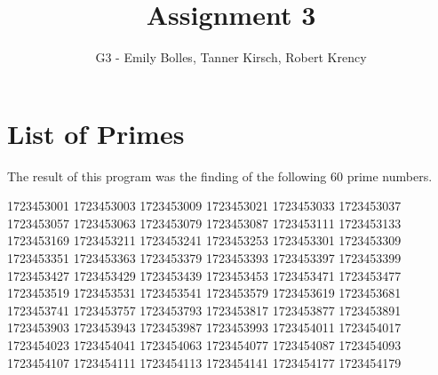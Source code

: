\documentclass[12pt]{article}
\title{Assignment 3}
\author{G3 - Emily Bolles, Tanner Kirsch, Robert Krency}
\date{}
\begin{document}
\maketitle

\section*{List of Primes}

The result of this program was the finding of the following \textbf{\(60\)} prime numbers.

\begin{center}
    1723453001  1723453003  1723453009  1723453021  1723453033  1723453037 \\
    1723453057  1723453063  1723453079  1723453087  1723453111  1723453133 \\ 
    1723453169  1723453211  1723453241  1723453253  1723453301  1723453309 \\
    1723453351  1723453363  1723453379  1723453393  1723453397  1723453399 \\
    1723453427  1723453429  1723453439  1723453453  1723453471  1723453477 \\
    1723453519  1723453531  1723453541  1723453579  1723453619  1723453681 \\
    1723453741  1723453757  1723453793  1723453817  1723453877  1723453891 \\ 
    1723453903  1723453943  1723453987  1723453993  1723454011  1723454017 \\
    1723454023  1723454041  1723454063  1723454077  1723454087  1723454093 \\
    1723454107  1723454111  1723454113  1723454141  1723454177  1723454179 \\
\end{center}
\end{document}
